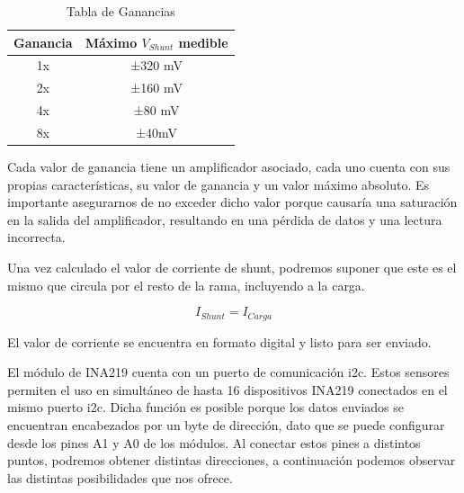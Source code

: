                     \begin{table}[H]
                        \centering
                        \begin{tabular}{|c|c|}
                        \hline
                            Ganancia & Máximo $V_{Shunt}$ medible\\
                        \hline
                             1x & ±320 mV \\
                        \hline
                            2x & ±160 mV\\
                        \hline
                            4x & ±80 mV\\
                        \hline
                            8x & ±40mV\\
                        \hline
                        \end{tabular}
                        \caption{Tabla de Ganancias}
                        \label{tab:s3}
                    \end{table}
                    
                    Cada valor de ganancia tiene un amplificador asociado, cada uno cuenta con sus propias características, su valor de ganancia y un valor máximo absoluto. Es importante asegurarnos de no exceder dicho valor porque causaría una saturación en la salida del amplificador, resultando en una pérdida de datos y una lectura incorrecta.\par
                    Una vez calculado el valor de corriente de shunt, podremos suponer que este es el mismo que circula por el resto de la rama, incluyendo a la carga.\par

                    \begin{equation}
                        I_{Shunt} = I_{Carga}
                    \end{equation}
                    
                    El valor de corriente se encuentra en formato digital y listo para ser enviado.\par
                    El módulo de INA219 cuenta con un puerto de comunicación i2c. Estos sensores permiten el uso en simultáneo de hasta 16 dispositivos INA219 conectados en el mismo puerto i2c. Dicha función es posible porque los datos enviados se encuentran encabezados por un byte de dirección, dato que se puede configurar desde los pines A1 y A0 de los módulos. Al conectar estos pines a distintos puntos, podremos obtener distintas direcciones, a continuación podemos observar las distintas posibilidades que nos ofrece.\par

